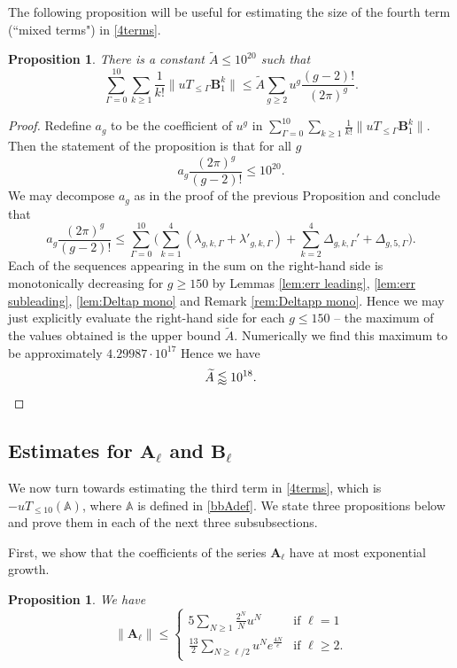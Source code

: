 \documentclass[12pt]{amsart}
\newtheorem{prop}[thm]{Proposition}
\theoremstyle{definition}
\numberwithin{equation}{section}
\renewcommand{\tilde}{\widetilde}
\newcommand{\bA}{\mathbf{A}}
\newcommand{\bB}{\mathbf{B}}
\newcommand{\numcheck}[1]{\cite[Computation #1]{SupplementaryNotebook}}
\theoremstyle{definition} %
\theoremstyle{remark}
\begin{document}
The following proposition will be useful for estimating the size of the fourth term (``mixed terms") in \eqref{4terms}.
\begin{prop}\label{prop:tilde A estimate}
There is a constant $\tilde A\leq 10^{20}$ such that 
\[
   \sum_{\Gamma=0}^{10}
    \sum_{k\geq 1} \frac 1{k!} \|u T_{\leq \Gamma} \bB_1^k\|
    \leq 
    \tilde A
    \sum_{g\geq 2} u^g \frac{(g-2)!}{(2\pi)^g}.
\]
\end{prop}
\begin{proof}
Redefine $a_g$ to be the coefficient of $u^g$ in  $\sum_{\Gamma=0}^{10}
\sum_{k\geq 1} \frac 1{k!} \|u T_{\leq \Gamma} \bB_1^k\|$.
Then the statement of the proposition is that for all $g$ 
\[
    a_g \frac{(2\pi)^g}{(g-2)!} \leq 10^{20}.
\]
We may decompose $a_g$ as in the proof of the previous Proposition and conclude that 
\[
a_g \frac{(2\pi)^g}{(g-2)!} \leq 
\sum_{\Gamma=0}^{10}
\Big(\sum_{k=1}^4 (\lambda_{g,k,\Gamma}+\lambda'_{g,k,\Gamma})
+ \sum_{k=2}^4 \Delta_{g,k,\Gamma}'
+
\Delta_{g,5,\Gamma}
 \Big).
\]
Each of the sequences appearing in the sum on the right-hand side is monotonically decreasing for $g\geq 150$ by Lemmas \ref{lem:err leading}, \ref{lem:err subleading}, \ref{lem:Deltap mono} and Remark \ref{rem:Deltapp mono}.
Hence we may just explicitly evaluate the right-hand side for each $g\leq 150$ -- the maximum of the values obtained is the upper bound $\tilde A$. 
Numerically we find this maximum to be approximately $4.29987\cdot 10^{17}$ \numcheck{ATILDE}
Hence we have
\[
    \tilde A \lessapprox 10^{18}. \qedhere
\]
\end{proof}

\subsection{Estimates for \texorpdfstring{$\bA_\ell$}{baell} and \texorpdfstring{$\bB_\ell$}{bbell}} \label{sec:bbA}

We now turn towards estimating the third term in \eqref{4terms}, which is $-uT_{\leq 10}(\mathbb{A})$, where $\mathbb{A}$ is defined in \eqref{bbAdef}. We state three propositions below and prove them in each of the next three subsubsections.

First, we show that the coefficients of the series $\bA_\ell$ have at most exponential growth.
\begin{prop}\label{prop:A bound}
    We have 
    \[
    \|\bA_\ell\| \leq 
    \begin{cases}
   5\sum_{N\geq 1}\frac{2^N}{N} u^N & \text{if $\ell=1$} \\
    \frac{13}{2} \sum_{N\geq \ell/2}  u^N
    e^{\frac{4N}e}
    & \text{if $\ell\geq 2$.}
    \end{cases}
    \]
\end{prop}
\end{document}
